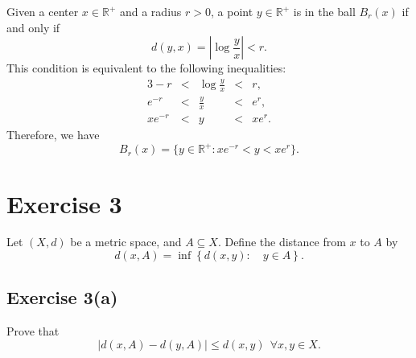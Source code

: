 \documentclass[12pt]{article}
\newenvironment{problem}
    {\begin{lrbox}{\mybox}\begin{minipage}{\textwidth-10pt}}
    {\end{minipage}\end{lrbox}\framebox[6.5in]{\usebox{\mybox}}}
\newcommand{\R}{\mathbb{R}}
\begin{document}
Given a center $x\in\R^+$ and a radius $r>0$, a point $y\in\R^+$ is in the ball $B_r(x)$ if and only if
\[d(y,x) = \left|\log\frac yx\right| < r.\]
This condition is equivalent to the following inequalities:
\begin{alignat*}{3}
    -r &<& \log\frac yx &<& r, \\
    e^{-r} &<& \frac yx &<& e^r, \\
    xe^{-r} &<& y &<& xe^r.
\end{alignat*}
Therefore, we have
\[B_r(x) = \{y\in\R^+ : xe^{-r}<y<xe^r\}.\]

\section*{Exercise 3}
\begin{problem}
    Let $(X,d)$ be a metric space, and $A\subseteq X$. Define the distance from $x$ to $A$ by
    \begin{equation}
    d(x,A) = \inf \left \{ d(x,y):\quad  y \in A \right \}.
    \end{equation}
\end{problem}

\newpage
\subsection*{Exercise 3(a)}
\begin{problem}
    Prove that
    \[
    \bigg | d(x,A) - d(y,A) \bigg | \le d(x,y)\ \ \forall x,y \in X.
    \]
\end{problem}
\end{document}
